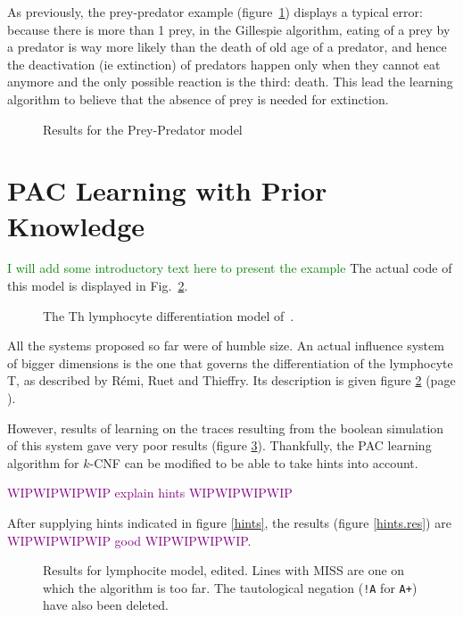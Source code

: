 \documentclass{llncs}
\newcommand{\wip}[1]{\textcolor{Purple}{WIPWIPWIPWIP #1 WIPWIPWIPWIP}}
\newcommand{\sylvain}[1]{\textcolor{green}{#1}}
\begin{document}
As previously, the prey-predator example (figure~\ref{preypred_res}) displays a typical error: because there is more than 1 prey, in the Gillespie algorithm, eating of a prey by a predator is way more likely than the death of old age of a predator, and hence the deactivation (ie extinction) of predators happen only when they cannot eat anymore and the only possible reaction is the third: death. This lead the learning algorithm to believe that the absence of prey is needed for extinction.
\begin{figure}
	
	\caption{Results for the Prey-Predator model\label{preypred_res}}
\end{figure}

\section{PAC Learning with Prior Knowledge}
\begin{example}
   \sylvain{I will add some introductory text here to present the example}
   The actual code of this model is displayed in Fig.~\ref{lympho}.
\begin{figure}[htbp]
	
	\caption{The Th lymphocyte differentiation model of~\cite{RRMTC06tcsb}.\label{lympho}}
\end{figure}
\end{example}

All the systems proposed so far were of humble size. An actual influence system of bigger dimensions is the one that governs the differentiation of the lymphocyte T, as described by R\'{e}mi, Ruet and Thieffry\cite{RRMTC06tcsb}. Its description is given figure \ref{lympho} (page \pageref{lympho}).

However, results of learning on the traces resulting from the boolean simulation of this system gave very poor results (figure \ref{lympho_res}). Thankfully, the PAC learning algorithm for $k$-CNF can be modified to be able to take hints into account.

\wip{explain hints}

After supplying hints indicated in figure \ref{hints}, the results (figure \ref{hints.res}) are \wip{good}.
	
\begin{figure}
	
	\caption{Results for lymphocite model, edited. Lines with MISS are one on which the algorithm is too far. The tautological negation (\texttt{!A} for \texttt{A+}) have also been deleted.\label{lympho_res}}
\end{figure}
\end{document}
